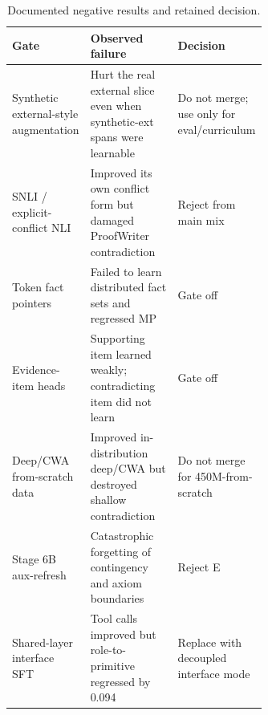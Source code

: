 \begin{table}[H]
\caption{Documented negative results and retained decision.\label{tab:negative_results}}
\footnotesize
\begin{tabularx}{\textwidth}{@{}p{0.25\linewidth}p{0.38\linewidth}X@{}}
\toprule
\textbf{Gate} & \textbf{Observed failure} & \textbf{Decision} \\
\midrule
Synthetic external-style augmentation & Hurt the real external slice even when synthetic-ext spans were learnable & Do not merge; use only for eval/curriculum \\
SNLI / explicit-conflict NLI & Improved its own conflict form but damaged ProofWriter contradiction & Reject from main mix \\
Token fact pointers & Failed to learn distributed fact sets and regressed MP & Gate off \\
Evidence-item heads & Supporting item learned weakly; contradicting item did not learn & Gate off \\
Deep/CWA from-scratch data & Improved in-distribution deep/CWA but destroyed shallow contradiction & Do not merge for 450M-from-scratch \\
Stage 6B aux-refresh & Catastrophic forgetting of contingency and axiom boundaries & Reject E \\
Shared-layer interface SFT & Tool calls improved but role-to-primitive regressed by 0.094 & Replace with decoupled interface mode \\
\bottomrule
\end{tabularx}
\end{table}

